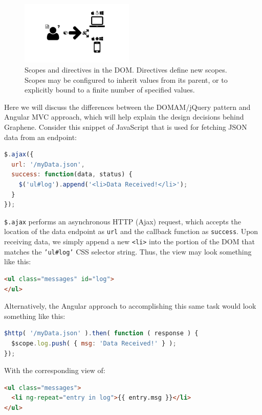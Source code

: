 \begin{figure}
  \centering
  \includegraphics[width=0.48\textwidth, page=23, trim=0cm 0cm 11cm 0cm, clip=true]{images/Figures.pdf}
  \caption{Scopes and directives in the DOM. Directives define new scopes. Scopes may be configured to inherit values from its parent, or to explicitly bound to a finite number of specified values.}
  \label{Figure:dom-scope}
\end{figure}


Here we will discuss the differences between the DOMAM/jQuery pattern and Angular MVC approach, which will help explain the design decisions behind Graphene.
Consider this snippet of JavaScript that is used for fetching JSON data from an endpoint:

\begin{lstlisting}[language=JavaScript]
$.ajax({
  url: '/myData.json',
  success: function(data, status) {
    $('ul#log').append('<li>Data Received!</li>');
  }
});
\end{lstlisting}

\texttt{\$.ajax} performs an asynchronous HTTP (Ajax) request, which accepts the location of the data endpoint as \texttt{url} and the callback function as \texttt{success}.
Upon receiving data, we simply append a new \texttt{<li>} into the portion of the DOM that matches the \texttt{'ul\#log'} CSS selector string.
Thus, the view may look something like this:

\begin{lstlisting}[language=html]
<ul class="messages" id="log">
</ul>
\end{lstlisting}

Alternatively, the Angular approach to accomplishing this same task would look something like this:

\begin{lstlisting}[language=JavaScript]
$http( '/myData.json' ).then( function ( response ) {
  $scope.log.push( { msg: 'Data Received!' } );
});
\end{lstlisting}

With the corresponding view of:

\begin{lstlisting}[language=html]
<ul class="messages">
  <li ng-repeat="entry in log">{{ entry.msg }}</li>
</ul>
\end{lstlisting}

